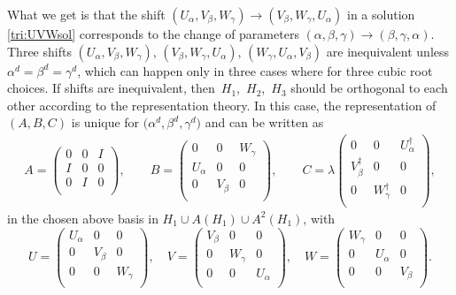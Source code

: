\documentclass[pdftex]{sigma}
\numberwithin{equation}{section}
\newcommand{\ea}[1]{\begin{align}#1\end{align}}
\newcommand{\bmp}{\begin{pmatrix}}
\newcommand{\emp}{\end{pmatrix}}
\begin{document}
What we get is that the shift
$(U_{\alpha}, V_{\beta},W_{\gamma}) \rightarrow (V_{\beta},W_{\gamma},U_{\alpha})$
in a solution \eqref{tri:UVWsol} corresponds to
the change of parameters
$({\alpha}, {\beta}, {\gamma}) \rightarrow ({\beta}, {\gamma}, {\alpha})$.
Three shifts $(U_{\alpha}, V_{\beta},W_{\gamma})$, $(V_{\beta},W_{\gamma},U_{\alpha})$,
$(W_{\gamma},U_{\alpha},V_{\beta})$ are inequivalent unless
$\alpha^d = \beta^d = \gamma^d$, which can happen only in three cases
where  for three cubic root choices.
If shifts are inequivalent, then~$H_1$,~$H_2$,~$H_3$ should be orthogonal to each other
according to the representation theory.
In this case, the representation of $(A,B,C)$ is unique for
$\bigl({\alpha^d}, {\beta^d}, {\gamma^d}\bigr)$ and can be written as
\ea{\label{tri:abcsol}
A = \bmp
0 & 0 & I \\
I & 0 & 0 \\
0 & I & 0 \\
\emp,
\qquad
B = \bmp
0 & 0 & W_\gamma \\
U_\alpha & 0 & 0 \\
0 & V_\beta & 0 \\
\emp,
\qquad
C = \lambda\bmp
0 & 0 & U^\dag_{\alpha} \\
V^\dag_{\beta} & 0 & 0 \\
0 & W^\dag_{\gamma} & 0 \\
\emp,
}
in the chosen above basis in $H_1 \cup A(H_1) \cup A^2(H_1)$, with
\[
 U = \bmp
 U_\alpha & 0 & 0 \\
 0 & V_\beta & 0 \\
 0 & 0 & W_\gamma \\
 \emp,
 \quad
 V = \bmp
 V_\beta & 0 & 0 \\
 0 & W_\gamma & 0 \\
 0 & 0 & U_\alpha \\
 \emp,
 \quad
 W = \bmp
 W_\gamma & 0 & 0 \\
 0 & U_\alpha & 0 \\
 0 & 0 & V_\beta \\
 \emp.
\]
\end{document}
